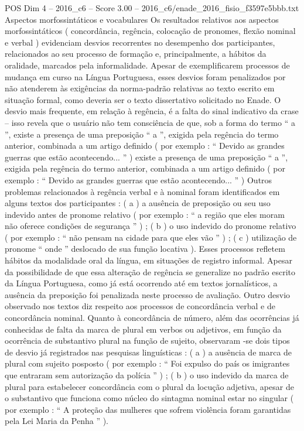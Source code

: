 \begin{textsample}{POS Dim 4 – 2016\_c6 – Score 3.00 – 2016\_c6/enade\_2016\_fisio\_f3597e5bbb.txt}
Aspectos morfossintáticos e vocabulares Os resultados relativos aos aspectos morfossintáticos ( concordância, regência, colocação de pronomes, flexão nominal e verbal ) evidenciam desvios recorrentes no desempenho dos participantes, relacionados ao seu processo de formação e, principalmente, a hábitos da oralidade, marcados pela informalidade.
Apesar de exemplificarem processos de mudança em curso na Língua Portuguesa, esses desvios foram penalizados por não atenderem às exigências da norma-padrão relativas ao texto escrito em situação formal, como deveria ser o texto dissertativo solicitado no Enade.
O desvio mais frequente, em relação à regência, é a falta do sinal indicativo da crase – isso revela que o usuário não tem consciência de que, sob a forma do termo “ a ”, existe a presença de uma preposição “ a ”, exigida pela regência do termo anterior, combinada a um artigo definido ( por exemplo : “ Devido as grandes guerras que estão acontecendo... ” ) existe a presença de uma preposição “ a ”, exigida pela regência do termo anterior, combinada a um artigo definido ( por exemplo : “ Devido as grandes guerras que estão acontecendo... ” ) Outros problemas relacionados à regência verbal e à nominal foram identificados em alguns textos dos participantes : ( a ) a ausência de preposição ou seu uso indevido antes de pronome relativo ( por exemplo : “ a região que eles moram não oferece condições de segurança ” ) ; ( b ) o uso indevido do pronome relativo ( por exemplo : “ não pensam na cidade para que eles vão ” ) ; ( c ) utilização de pronome “ onde ” deslocado de sua função locativa ).
Esses processos refletem hábitos da modalidade oral da língua, em situações de registro informal.
Apesar da possibilidade de que essa alteração de regência se generalize no padrão escrito da Língua Portuguesa, como já está ocorrendo até em textos jornalísticos, a ausência da preposição foi penalizada neste processo de avaliação.
Outro desvio observado nos textos diz respeito aos processos de concordância verbal e de concordância nominal.
Quanto à concordância de número, além das ocorrências já conhecidas de falta da marca de plural em verbos ou adjetivos, em função da ocorrência de substantivo plural na função de sujeito, observaram -se dois tipos de desvio já registrados nas pesquisas linguísticas : ( a ) a ausência de marca de plural com sujeito posposto ( por exemplo : “ Foi expulso do país os imigrantes que entraram sem autorização da polícia ” ) ; ( b ) o uso indevido da marca de plural para estabelecer concordância com o plural da locução adjetiva, apesar de o substantivo que funciona como núcleo do sintagma nominal estar no singular ( por exemplo : “ A proteção das mulheres que sofrem violência foram garantidas pela Lei Maria da Penha ” ).

\end{textsample}
